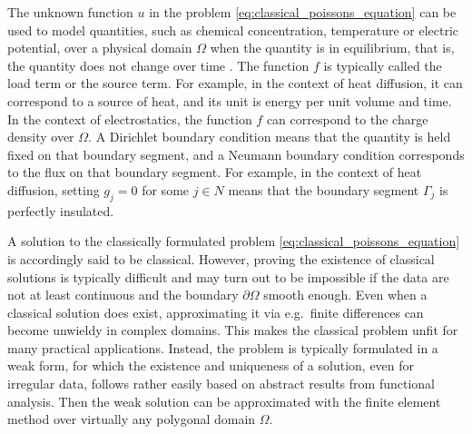 \documentclass[english, 12pt, a4paper, sci, utf8, a-2b, online]{aaltothesis}
\theoremstyle{definition}
\theoremstyle{plain}
\numberwithin{equation}{section}
\begin{document}
The unknown function $u$ in the problem \eqref{eq:classical_poissons_equation}
can be used to model quantities, such as chemical concentration, temperature or
electric potential, over a physical domain $\Omega$ when the quantity is
in equilibrium, that is, the quantity does not change over time \cite{evans2010}. 
The function $f$ is typically called the load term or the source term. For example,
in the context of heat diffusion, it can correspond to a source of heat,
and its unit is energy per unit volume and time. In the context of electrostatics,
the function $f$ can correspond to the charge density over $\Omega$.
A Dirichlet boundary condition means that the quantity is held fixed
on that boundary segment,
and a Neumann boundary condition corresponds to the flux
on that boundary segment. For example, in the context of heat diffusion,
setting $g_j = 0$ for some $j \in N$ means that the boundary segment $\Gamma_j$ is perfectly 
insulated.

A solution to the classically formulated problem 
\eqref{eq:classical_poissons_equation} is accordingly said to be classical.
However, proving the existence of classical solutions is typically difficult
and may turn out to be impossible if the data are not at least continuous
and the boundary $\partial \Omega$ smooth enough.
Even when a classical solution does exist, approximating it via
e.g.\ finite differences can become unwieldy in complex domains.
This makes the classical problem unfit for many practical applications.
Instead, the problem is typically formulated in a weak form, for which
the existence and uniqueness of a solution, even for irregular data,
follows rather easily based on abstract results from functional analysis.
Then the weak solution can be approximated
with the finite element method over virtually any polygonal domain $\Omega$.
\end{document}
